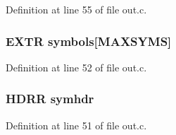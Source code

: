 Definition at line 55 of file out.\+c.

\subsubsection[{symbols}]{\setlength{\rightskip}{0pt plus 5cm}E\+X\+TR symbols[{\bf M\+A\+X\+S\+Y\+MS}]}\label{out_8c_a554b3d27c80146901a0e4e77eabccebc}


Definition at line 52 of file out.\+c.

\subsubsection[{symhdr}]{\setlength{\rightskip}{0pt plus 5cm}H\+D\+RR symhdr}\label{out_8c_a57180dec46147996607b066d5bc013cf}


Definition at line 51 of file out.\+c.

